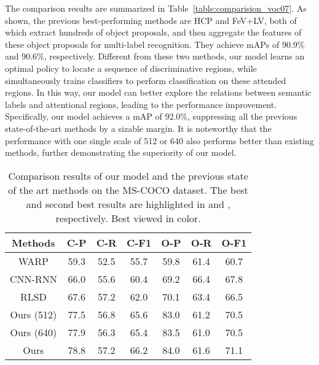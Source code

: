 \documentclass[letterpaper]{article} %
\begin{document}
The comparison results are summarized in Table~\ref{table:comparision_voc07}. As shown, the previous best-performing methods are HCP and FeV+LV, both of which extract hundreds of object proposals, and then aggregate the features of these object proposals for multi-label recognition. They achieve mAPs of 90.9\% and 90.6\%, respectively. Different from these two methods, our model learns an optimal policy to locate a sequence of discriminative regions, while simultaneously trains classifiers to perform classification on these attended regions. In this way, our model can better explore the relations between semantic labels and attentional regions, leading to the performance improvement. Specifically, our model achieves a mAP of 92.0\%, suppressing all the previous state-of-the-art methods by a sizable margin. It is noteworthy that the performance with one single scale of 512 or 640 also performs better than existing methods, further demonstrating the superiority of our model.


\begin{table}[htp]
\centering
\begin{tabular}{c|ccc|ccc}
\hline
\centering Methods  & C-P & C-R & C-F1 & O-P & O-R & O-F1  \\
\hline
\hline
\centering  WARP  & 59.3 & 52.5 & 55.7 & 59.8 & 61.4 & 60.7   \\
\centering  CNN-RNN & 66.0 & 55.6 & 60.4 & 69.2 & \textcolor[rgb]{1,0,0}{66.4} & 67.8 \\
\centering RLSD  & 67.6 &  57.2 &  62.0 & 70.1 & \textcolor[rgb]{0,0,1}{63.4} & 66.5 \\
\hline
\centering  Ours (512)  & 77.5 &  \textcolor[rgb]{0,0,1}{56.8} &  \textcolor[rgb]{0,0,1}{65.6} & 83.0 & 61.2 & \textcolor[rgb]{0,0,1}{70.5} \\
\centering  Ours (640)  & \textcolor[rgb]{0,0,1}{77.9} & 56.3 & 65.4 &  \textcolor[rgb]{0,0,1}{83.5} & 61.0 &  \textcolor[rgb]{0,0,1}{70.5} \\
\centering  Ours & \textcolor[rgb]{1,0,0}{78.8} &\textcolor[rgb]{1,0,0}{57.2} & \textcolor[rgb]{1,0,0}{66.2} & \textcolor[rgb]{1,0,0}{84.0} &  61.6 & \textcolor[rgb]{1,0,0}{71.1} \\
\hline
\end{tabular}
\caption{Comparison results of our model and the previous state of the art methods on the MS-COCO dataset. The best and second best results are highlighted in {\color{red}{red}} and {\color{blue}{blue}}, respectively. Best viewed in color.}
\label{table:coco_comparison}
\end{table}
\end{document}

